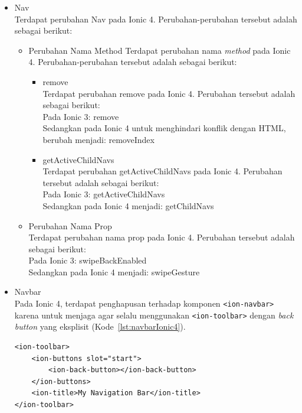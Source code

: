 \begin{enumerate}
\begin{enumerate}
\begin{itemize}
\begin{itemize}
				\item Nav \\
				Terdapat perubahan Nav pada Ionic 4. Perubahan-perubahan tersebut adalah sebagai berikut:
				\begin{itemize}
					\item Perubahan Nama Method 
					Terdapat perubahan nama {\it method} pada Ionic 4. Perubahan-perubahan tersebut adalah sebagai berikut:
					\begin{itemize}				
					\newpage
						\item remove \\
						Terdapat perubahan remove pada Ionic 4. Perubahan tersebut adalah sebagai berikut:\\
						Pada Ionic 3: remove \\
						Sedangkan pada Ionic 4 untuk menghindari konflik dengan HTML, berubah menjadi: removeIndex 

						\item getActiveChildNavs \\
						Terdapat perubahan getActiveChildNavs pada Ionic 4. Perubahan tersebut adalah sebagai berikut:\\
						Pada Ionic 3: getActiveChildNavs \\
						Sedangkan pada Ionic 4 menjadi: getChildNavs
					\end{itemize}

					\item Perubahan Nama Prop \\
					Terdapat perubahan nama prop pada Ionic 4. Perubahan tersebut adalah sebagai berikut:\\
					Pada Ionic 3: swipeBackEnabled   \\
					Sedangkan pada Ionic 4 menjadi: swipeGesture
				\end{itemize}	



				\item Navbar \\
				Pada Ionic 4, terdapat penghapusan terhadap komponen \texttt{<ion-navbar>} karena untuk menjaga agar selalu menggunakan \texttt{<ion-toolbar>} dengan {\it back button} yang eksplisit (Kode~\ref{lst:navbarIonic4}).				
				
\begin{lstlisting}[label={lst:navbarIonic4}, caption=Penggunaan Navbar pada Ionic 4 dengan {\it Back Button}]
<ion-toolbar>
	<ion-buttons slot="start">
		<ion-back-button></ion-back-button>
	</ion-buttons>
	<ion-title>My Navigation Bar</ion-title>
</ion-toolbar>
\end{lstlisting}
				

\end{itemize}
\end{itemize}
\end{enumerate}
\end{enumerate}
